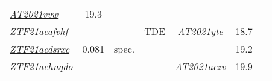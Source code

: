 \begin{table*}
\begin{tabular}{l  c  c  c   c  c  c}
    \textit{\href{https://www.wis-tns.org/object/2021vvw}{AT2021vvw}}                                 & 19.3           &                                                                                                                  \\
    \textit{\href{https://ztfnuclear.simeonreusch.com/transient/ZTF21acafvhf}{ZTF21acafvhf}}          & ~              & ~              & TDE                     &
    \textit{\href{https://www.wis-tns.org/object/2021yte}{AT2021yte}}                                 & 18.7           &                                                                                                                  \\
    \textit{\href{https://ztfnuclear.simeonreusch.com/transient/ZTF21acdsrxc}{ZTF21acdsrxc}}          & 0.081          & spec.          & ~                       & ~                 & 19.2                       &                      \\
    \textit{\href{https://ztfnuclear.simeonreusch.com/transient/ZTF21achnqdo}{ZTF21achnqdo}}          & ~              & ~              & ~                       &
    \textit{\href{https://www.wis-tns.org/object/2021aczv}{AT2021aczv}}                               & 19.9           &                                                                                                                  \\
  \end{tabular}
\end{table*}

